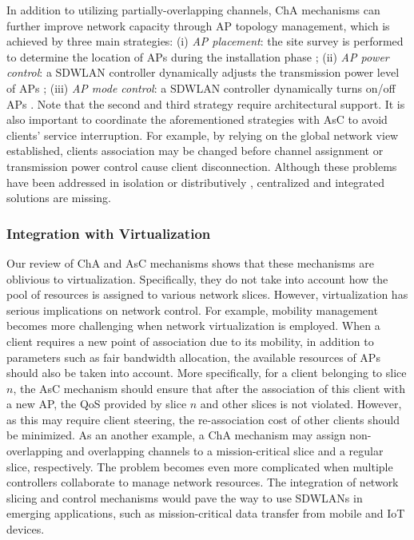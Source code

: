 In addition to utilizing partially-overlapping channels, ChA mechanisms can further improve network capacity through AP topology management, which is achieved by three main strategies:
(i) \textit{AP placement}: the site survey is performed to determine the location of APs during the installation phase \cite{zvanovec2003wireless};
(ii) \textit{AP power control}: a SDWLAN controller dynamically adjusts the transmission power level of APs \cite{li2011achieving};
(iii) \textit{AP mode control}: a SDWLAN controller dynamically turns on/off APs \cite{EmPOWER}.
Note that the second and third strategy require architectural support.
It is also important to coordinate the aforementioned strategies with AsC to avoid clients' service interruption.
For example, by relying on the global network view established, clients association may be changed before channel assignment or transmission power control cause client disconnection. 
Although these problems have been addressed in isolation or distributively \cite{bejerano2009cell,wang2014coverage,DenseWLAN1,huang2010distributed}, centralized and integrated solutions are missing. 



\subsubsection{\textbf{Integration with Virtualization}}
\label{ch_disc_int_virt}
Our review of ChA and AsC mechanisms shows that these mechanisms are oblivious to virtualization.
Specifically, they do not take into account how the pool of resources is assigned to various network slices.
However, virtualization has serious implications on network control.
For example, mobility management becomes more challenging when network virtualization is employed.
When a client requires a new point of association due to its mobility, in addition to parameters such as fair bandwidth allocation, the available resources of APs should also be taken into account. 
More specifically, for a client belonging to slice $n$, the AsC mechanism should ensure that after the association of this client with a new AP, the QoS provided by slice $n$ and other slices is not violated.
However, as this may require client steering, the re-association cost of other clients should be minimized.
As an another example, a ChA mechanism may assign non-overlapping and overlapping channels to a mission-critical slice and a regular slice, respectively.
The problem becomes even more complicated when multiple controllers collaborate to manage network resources.
The integration of network slicing and control mechanisms would pave the way to use SDWLANs in emerging applications, such as mission-critical data transfer from mobile and IoT devices.

